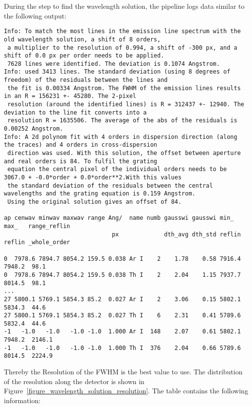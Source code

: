 \documentclass[10pt,a4paper]{article}
\begin{document}
During the step to find the wavelength solution, the pipeline logs data similar to the following output:
\begin{lstlisting}[style=base, basicstyle=\tiny]
Info: To match the most lines in the emission line spectrum with the old wavelength solution, a shift of 8 orders,
 a multiplier to the resolution of 0.994, a shift of -300 px, and a shift of 0.0 px per order needs to be applied.
 7628 lines were identified. The deviation is 0.1074 Angstrom.
Info: used 3413 lines. The standard deviation (using 8 degrees of freedom) of the residuals between the lines and
 the fit is 0.00334 Angstrom. The FWHM of the emission lines results in an R = 156231 +- 45280. The 2-pixel
 resolution (around the identified lines) is R = 312437 +- 12940. The deviation to the line fit converts into a
 resolution R = 1635506. The average of the abs of the residuals is 0.00252 Angstrom. 
Info: A 2d polynom fit with 4 orders in dispersion direction (along the traces) and 4 orders in cross-dispersion
 direction was used. With this solution, the offset between aperture and real orders is 84. To fulfil the grating
 equation the central pixel of the individual orders needs to be 3067.0 + -0.0*order + 0.0*order**2.With this values
 the standard deviation of the residuals between the central wavelengths and the grating equation is 0.159 Angstrom.
 Using the original solution gives an offset of 84.

ap cenwav minwav maxwav range Ang/  name numb gausswi gausswi min_   max_   range_reflin
                               px             dth_avg dth_std reflin reflin _whole_order

0  7978.6 7894.7 8054.2 159.5 0.038 Ar I    2    1.78    0.58 7916.4 7948.2  98.1
0  7978.6 7894.7 8054.2 159.5 0.038 Th I    2    2.04    1.15 7937.7 8014.5  98.1
...
27 5800.1 5769.1 5854.3 85.2  0.027 Ar I    2    3.06    0.15 5802.1 5834.3  44.6
27 5800.1 5769.1 5854.3 85.2  0.027 Th I    6    2.31    0.41 5789.6 5832.4  44.6
-1   -1.0   -1.0   -1.0 -1.0  1.000 Ar I  148    2.07    0.61 5802.1 7948.2  2146.1
-1   -1.0   -1.0   -1.0 -1.0  1.000 Th I  376    2.04    0.66 5789.6 8014.5  2224.9
\end{lstlisting} 
Thereby the Resolution of the FWHM is the best value to use. The distribution of the resolution along the detector is shown in Figure~\ref{figure_wavelength_solution_resolution}. The table contains the following information:
\end{document}
